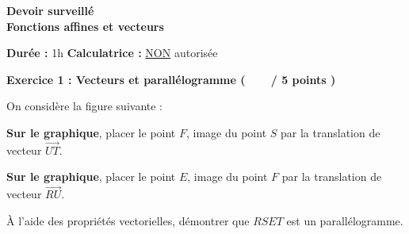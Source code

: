 \documentclass[12pt,a4paper]{exam}
\begin{document}
\begin{center}
    \Large\textbf{Devoir surveillé\\Fonctions affines et vecteurs}
\end{center}

\vspace{0.3cm}

\noindent
\textbf{Durée :} 1h \hfill
\textbf{Calculatrice :} \underline{NON} autorisée

\vspace{0.5cm}

\noindent
\textbf{Exercice 1 : Vecteurs et parallélogramme (\ \ \ \  / 5 points )}
\vspace{5pt}

On considère la figure suivante :

\begin{center}
\end{center}

\begin{questions}

\question[1,5] \textbf{Sur le graphique}, placer le point $F$, image du point $S$ par la translation de 
vecteur $\overrightarrow{UT}$.

\question[1,5] \textbf{Sur le graphique}, placer le point $E$, image du point $F$ par la translation de 
vecteur $\overrightarrow{RU}$.

\question[2] À l'aide des propriétés vectorielles, démontrer que $RSET$ est un parallélogramme.

\end{questions}
\end{document}
